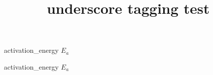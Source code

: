 \documentclass{article}
\title{underscore tagging test}
\begin{document}
activation_energy $E_a$

activation\_energy $E_a$
\end{document}
